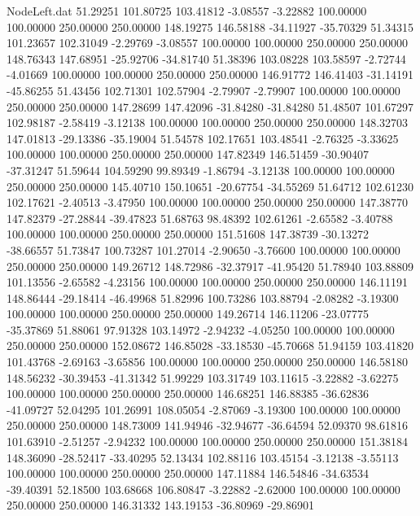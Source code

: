 \begin{filecontents}{NodeLeft.dat}
  51.29251  101.80725  103.41812    -3.08557   -3.22882  100.00000  100.00000  250.00000  250.00000  148.19275  146.58188  -34.11927  -35.70329
  51.34315  101.23657  102.31049    -2.29769   -3.08557  100.00000  100.00000  250.00000  250.00000  148.76343  147.68951  -25.92706  -34.81740
  51.38396  103.08228  103.58597    -2.72744   -4.01669  100.00000  100.00000  250.00000  250.00000  146.91772  146.41403  -31.14191  -45.86255
  51.43456  102.71301  102.57904    -2.79907   -2.79907  100.00000  100.00000  250.00000  250.00000  147.28699  147.42096  -31.84280  -31.84280
  51.48507  101.67297  102.98187    -2.58419   -3.12138  100.00000  100.00000  250.00000  250.00000  148.32703  147.01813  -29.13386  -35.19004
  51.54578  102.17651  103.48541    -2.76325   -3.33625  100.00000  100.00000  250.00000  250.00000  147.82349  146.51459  -30.90407  -37.31247
  51.59644  104.59290   99.89349    -1.86794   -3.12138  100.00000  100.00000  250.00000  250.00000  145.40710  150.10651  -20.67754  -34.55269
  51.64712  102.61230  102.17621    -2.40513   -3.47950  100.00000  100.00000  250.00000  250.00000  147.38770  147.82379  -27.28844  -39.47823
  51.68763   98.48392  102.61261    -2.65582   -3.40788  100.00000  100.00000  250.00000  250.00000  151.51608  147.38739  -30.13272  -38.66557
  51.73847  100.73287  101.27014    -2.90650   -3.76600  100.00000  100.00000  250.00000  250.00000  149.26712  148.72986  -32.37917  -41.95420
  51.78940  103.88809  101.13556    -2.65582   -4.23156  100.00000  100.00000  250.00000  250.00000  146.11191  148.86444  -29.18414  -46.49968
  51.82996  100.73286  103.88794    -2.08282   -3.19300  100.00000  100.00000  250.00000  250.00000  149.26714  146.11206  -23.07775  -35.37869
  51.88061   97.91328  103.14972    -2.94232   -4.05250  100.00000  100.00000  250.00000  250.00000  152.08672  146.85028  -33.18530  -45.70668
  51.94159  103.41820  101.43768    -2.69163   -3.65856  100.00000  100.00000  250.00000  250.00000  146.58180  148.56232  -30.39453  -41.31342
  51.99229  103.31749  103.11615    -3.22882   -3.62275  100.00000  100.00000  250.00000  250.00000  146.68251  146.88385  -36.62836  -41.09727
  52.04295  101.26991  108.05054    -2.87069   -3.19300  100.00000  100.00000  250.00000  250.00000  148.73009  141.94946  -32.94677  -36.64594
  52.09370   98.61816  101.63910    -2.51257   -2.94232  100.00000  100.00000  250.00000  250.00000  151.38184  148.36090  -28.52417  -33.40295
  52.13434  102.88116  103.45154    -3.12138   -3.55113  100.00000  100.00000  250.00000  250.00000  147.11884  146.54846  -34.63534  -39.40391
  52.18500  103.68668  106.80847    -3.22882   -2.62000  100.00000  100.00000  250.00000  250.00000  146.31332  143.19153  -36.80969  -29.86901

\end{filecontents}

